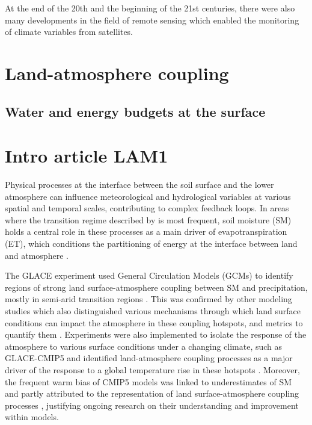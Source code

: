 At the end of the 20th and the beginning of the 21st centuries, there were also many developments in the field of remote sensing which enabled the monitoring of climate variables from satellites. 

\section{Land-atmosphere coupling}

\subsection{Water and energy budgets at the surface}

\section{Intro article LAM1}
Physical processes at the interface between the soil surface and the lower atmosphere can influence meteorological 
and hydrological 
variables at various spatial and temporal scales, contributing to complex feedback loops.
In areas where the transition regime described by \citet{Budyko_1956, Budyko_1974} is most frequent, soil moisture (SM) holds a central role in these processes as a main driver of evapotranspiration (ET), which conditions the partitioning of energy at the interface between land and atmosphere \citep{betts_fife_1995, seneviratne_investigating_2010}. 
 
The GLACE experiment used General Circulation Models (GCMs) to identify regions of strong land surface-atmosphere coupling between SM and precipitation, mostly in semi-arid transition regions \citep{koster_regions_2004}. This was confirmed by other modeling studies which also distinguished various mechanisms through which land surface conditions can impact the atmosphere in these coupling hotspots, and metrics to quantify them \citep{dirmeyer_terrestrial_2011, zou_precipitation_2023}.
Experiments were also implemented to isolate the response of the atmosphere to various surface conditions under a changing climate, such as GLACE-CMIP5 \citep{seneviratne_impact_2013} and identified land-atmosphere coupling processes as a major driver of the response to a global temperature rise in these hotspots \citep{berg_interannual_2015}. 
Moreover, the frequent warm bias of CMIP5 models \citep{christensen_temperature_2012, mueller_systematic_2014} was linked to underestimates of SM \citep{al-yaari_satellite-based_2019} and partly attributed to the representation of land surface-atmosphere coupling processes \citep{cheruy_combined_2013, cheruy_role_2014}, justifying ongoing research on their understanding and improvement within models.

